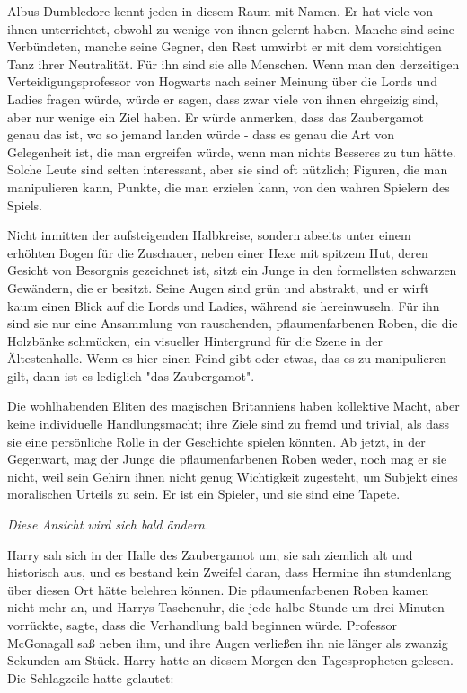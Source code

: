{Albus Dumbledore kennt jeden in diesem Raum mit Namen. Er hat viele von ihnen unterrichtet, obwohl zu wenige von ihnen gelernt haben. Manche sind seine Verbündeten, manche seine Gegner, den Rest umwirbt er mit dem vorsichtigen Tanz ihrer Neutralität. Für ihn sind sie alle Menschen. Wenn man den derzeitigen Verteidigungsprofessor von Hogwarts nach seiner Meinung über die Lords und Ladies fragen würde, würde er sagen, dass zwar viele von ihnen ehrgeizig sind, aber nur wenige ein Ziel haben. Er würde anmerken, dass das Zaubergamot genau das ist, wo so jemand landen würde - dass es genau die Art von Gelegenheit ist, die man ergreifen würde, wenn man nichts Besseres zu tun hätte. Solche Leute sind selten interessant, aber sie sind oft nützlich; Figuren, die man manipulieren kann, Punkte, die man erzielen kann, von den wahren Spielern des Spiels.

Nicht inmitten der aufsteigenden Halbkreise, sondern abseits unter einem erhöhten Bogen für die Zuschauer, neben einer Hexe mit spitzem Hut, deren Gesicht von Besorgnis gezeichnet ist, sitzt ein Junge in den formellsten schwarzen Gewändern, die er besitzt. Seine Augen sind grün und abstrakt, und er wirft kaum einen Blick auf die Lords und Ladies, während sie hereinwuseln. Für ihn sind sie nur eine Ansammlung von rauschenden, pflaumenfarbenen Roben, die die Holzbänke schmücken, ein visueller Hintergrund für die Szene in der Ältestenhalle. Wenn es hier einen Feind gibt oder etwas, das es zu manipulieren gilt, dann ist es lediglich "das Zaubergamot".

Die wohlhabenden Eliten des magischen Britanniens haben kollektive Macht, aber keine individuelle Handlungsmacht; ihre Ziele sind zu fremd und trivial, als dass sie eine persönliche Rolle in der Geschichte spielen könnten. Ab jetzt, in der Gegenwart, mag der Junge die pflaumenfarbenen Roben weder, noch mag er sie nicht, weil sein Gehirn ihnen nicht genug Wichtigkeit zugesteht, um Subjekt eines moralischen Urteils zu sein. Er ist ein Spieler, und sie sind eine Tapete.

\emph{Diese Ansicht wird sich bald ändern.}

Harry sah sich in der Halle des Zaubergamot um; sie sah ziemlich alt und historisch aus, und es bestand kein Zweifel daran, dass Hermine ihn stundenlang über diesen Ort hätte belehren können. Die pflaumenfarbenen Roben kamen nicht mehr an, und Harrys Taschenuhr, die jede halbe Stunde um drei Minuten vorrückte, sagte, dass die Verhandlung bald beginnen würde. Professor McGonagall saß neben ihm, und ihre Augen verließen ihn nie länger als zwanzig Sekunden am Stück. Harry hatte an diesem Morgen den Tagespropheten gelesen. Die Schlagzeile hatte gelautet:

}
